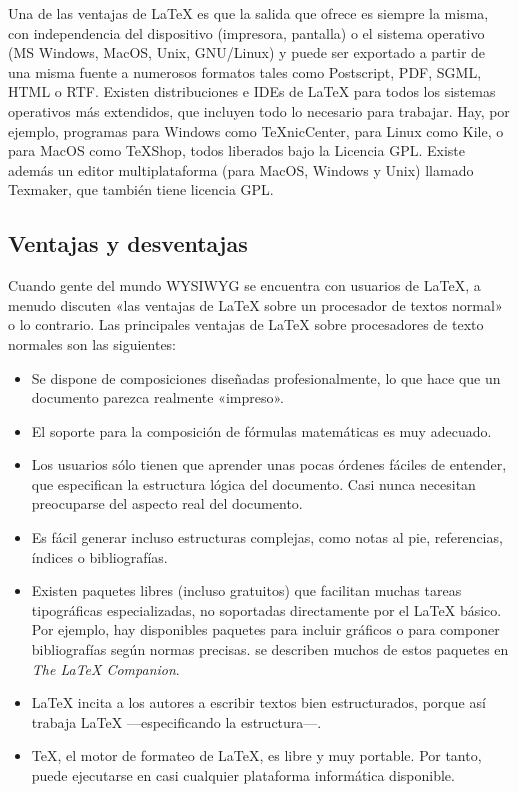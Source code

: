     Una de las ventajas de LaTeX es que la salida que ofrece es siempre la misma, con independencia del dispositivo (impresora, pantalla) o el sistema operativo (MS Windows, MacOS, Unix, GNU/Linux) y puede ser exportado a partir de una misma fuente a numerosos formatos tales como Postscript, PDF, SGML, HTML o RTF. Existen distribuciones e IDEs de LaTeX para todos los sistemas operativos más extendidos, que incluyen todo lo necesario para trabajar. Hay, por ejemplo, programas para Windows como TeXnicCenter, para Linux como Kile, o para MacOS como TeXShop, todos liberados bajo la Licencia GPL. Existe además un editor multiplataforma (para MacOS, Windows y Unix) llamado Texmaker, que también tiene licencia GPL.
  
  \subsection{Ventajas y desventajas} %
    \label{sub:latex_ventajas_y_desventajas}
    
    Cuando gente del mundo WYSIWYG se encuentra con usuarios de LaTeX, a menudo discuten «las ventajas de LaTeX sobre un procesador de textos normal» o lo contrario. Las principales ventajas de LaTeX sobre procesadores de texto normales son las siguientes:
    
    \begin{itemize}
      \item Se dispone de composiciones diseñadas profesionalmente, lo que hace que un documento parezca realmente «impreso».
      \item El soporte para la composición de fórmulas matemáticas es muy adecuado.
      \item Los usuarios sólo tienen que aprender unas pocas órdenes fáciles de entender, que especifican la estructura lógica del documento. Casi nunca necesitan preocuparse del aspecto real del documento.
      \item Es fácil generar incluso estructuras complejas, como notas al pie, referencias, índices o bibliografías.
      \item Existen paquetes libres (incluso gratuitos) que facilitan muchas tareas tipográficas especializadas, no soportadas directamente por el LaTeX básico. Por ejemplo, hay disponibles paquetes para incluir gráficos o para componer bibliografías según normas precisas. se describen muchos de estos paquetes en {\it The LaTeX Companion}.\cite{LATCOMP04}
      \item LaTeX incita a los autores a escribir textos bien estructurados, porque así trabaja LaTeX ---especificando la estructura---.
      \item TeX, el motor de formateo de LaTeX, es libre y muy portable. Por tanto, puede ejecutarse en casi cualquier plataforma informática disponible.
    \end{itemize}
    
